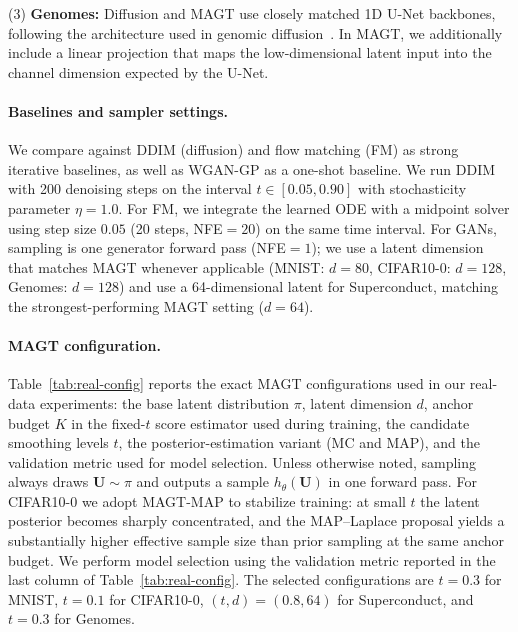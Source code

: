 \documentclass[12pt]{article}
\theoremstyle{definition} %
\newcommand{\U}{\bm U}
\providecommand{\method}{MAGT} %
\begin{document}
(3) \textbf{Genomes:} Diffusion and \method{} use closely matched 1D U-Net backbones, following the architecture used in genomic diffusion~\citep{kenneweg2025generating}. In \method{}, we additionally include a linear projection that maps the low-dimensional latent input into the channel dimension expected by the U-Net.

\paragraph{Baselines and sampler settings.}
We compare against DDIM \citep{song2020ddim} (diffusion) and flow matching (\textsc{FM}) \citep{lipman2022flow,liu2022flow} as strong iterative baselines, as well as WGAN-GP as a one-shot baseline.
We run DDIM with 200 denoising steps on the interval $t\in[0.05,0.90]$ with stochasticity parameter $\eta=1.0$.
For FM, we integrate the learned ODE with a midpoint solver using step size $0.05$ (20 steps, NFE$=20$) on the same time interval.
For GANs, sampling is one generator forward pass (NFE$=1$); we use a latent dimension that matches \method{} whenever applicable (MNIST: $d=80$, CIFAR10-0: $d=128$, Genomes: $d=128$) and use a 64-dimensional latent for Superconduct, matching the strongest-performing \method{} setting ($d=64$).

\paragraph{\method{} configuration.}
Table~\ref{tab:real-config} reports the exact \method{} configurations used in our real-data experiments:
the base latent distribution $\pi$, latent dimension $d$, anchor budget $K$ in the fixed-$t$ score estimator used during training, the candidate smoothing levels $t$, the posterior-estimation variant (MC and MAP), and the validation metric used for model selection.
Unless otherwise noted, sampling always draws $\U\sim\pi$ and outputs a sample $h_{\theta}(\U)$ in one forward pass. For CIFAR10-0 we adopt \method{}-MAP to stabilize training: at small $t$ the latent posterior becomes sharply concentrated, and the MAP--Laplace proposal yields a substantially higher effective sample size than prior sampling at the same anchor budget.
We perform model selection using the validation metric reported in the last column of Table~\ref{tab:real-config}.
The selected configurations are $t=0.3$ for MNIST, $t=0.1$ for CIFAR10-0, $(t,d)=(0.8,64)$ for Superconduct, and $t=0.3$ for Genomes.
\end{document}
